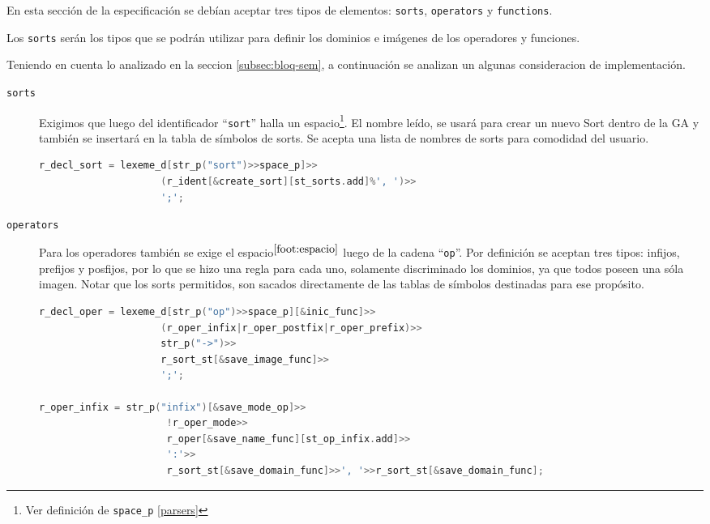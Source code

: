 En esta sección de la especificación se debían aceptar tres tipos de elementos: \texttt{sorts}, \texttt{operators} y \texttt{functions}.

Los \texttt{sorts} serán los tipos que se podrán utilizar para definir los dominios e imágenes de los operadores y funciones.

Teniendo en cuenta lo analizado en la seccion \ref{subsec:bloq-sem}, a continuación se analizan un algunas consideracion de implementación.

\begin{description}
\item [\texttt{sorts}] Exigimos que luego del identificador ``\texttt{sort}'' halla un espacio\footnote{\label{foot:espacio} Ver definición de \texttt{space\_p} \ref{parsers}}. El nombre leído, se usará para crear un nuevo Sort dentro de la GA y también se insertará en la tabla de símbolos de sorts. Se acepta una lista de nombres de sorts para comodidad del usuario.

\begin{lstlisting}[language=C++, basicstyle=\scriptsize, columns=fullflexible, linewidth=9cm]
r_decl_sort = lexeme_d[str_p("sort")>>space_p]>>
                     (r_ident[&create_sort][st_sorts.add]%', ')>>
                     ';';
\end{lstlisting}

\item [\texttt{operators}] Para los operadores también se exige el espacio$^{\ref{foot:espacio}}$ luego de la cadena ``\texttt{op}''. Por definición se aceptan tres tipos: infijos, prefijos y posfijos, por lo que se hizo una regla para cada uno, solamente discriminado los dominios, ya que todos poseen una sóla imagen. Notar que los sorts permitidos, son sacados directamente de las tablas de símbolos destinadas para ese propósito.

\begin{lstlisting}[language=C++, basicstyle=\scriptsize, columns=fullflexible, linewidth=13cm]
r_decl_oper = lexeme_d[str_p("op")>>space_p][&inic_func]>>
                     (r_oper_infix|r_oper_postfix|r_oper_prefix)>>
                     str_p("->")>>
                     r_sort_st[&save_image_func]>>
                     ';';

r_oper_infix = str_p("infix")[&save_mode_op]>>
                      !r_oper_mode>>
                      r_oper[&save_name_func][st_op_infix.add]>>
                      ':'>>
                      r_sort_st[&save_domain_func]>>', '>>r_sort_st[&save_domain_func];


\end{lstlisting}
\end{description}
